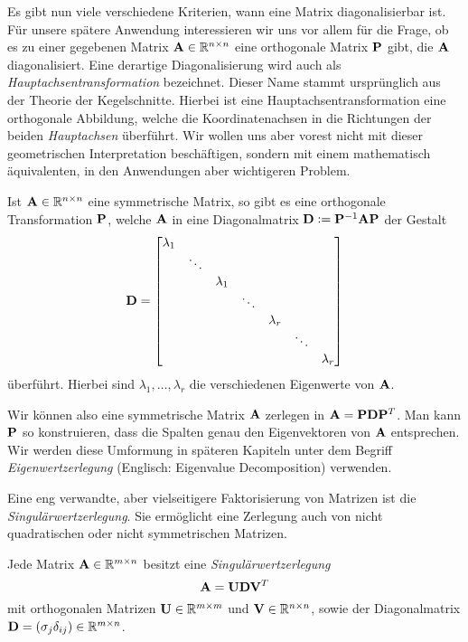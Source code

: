 Es gibt nun viele verschiedene Kriterien, wann eine Matrix diagonalisierbar ist. Für unsere spätere Anwendung interessieren wir uns vor allem für die Frage, ob es zu einer gegebenen Matrix $\mathbf{A} \in \mathbb{R}^{n \times n}$ eine orthogonale Matrix $\mathbf{P}$ gibt, die $\mathbf{A}$ diagonalisiert. Eine derartige Diagonalisierung wird auch als \textit{Hauptachsentransformation} bezeichnet. Dieser Name stammt ursprünglich aus der Theorie der Kegelschnitte. Hierbei ist eine Hauptachsentransformation eine orthogonale Abbildung, welche die Koordinatenachsen in die Richtungen der beiden \textit{Hauptachsen} überführt. Wir wollen uns aber vorest nicht mit dieser geometrischen Interpretation beschäftigen, sondern mit einem mathematisch äquivalenten, in den Anwendungen aber wichtigeren Problem.

\begin{thm}
Ist $\mathbf{A} \in \mathbb{R}^{n \times n}$ eine symmetrische Matrix, so gibt es eine orthogonale Transformation $\mathbf{P}$, welche $\mathbf{A}$ in eine Diagonalmatrix $\mathbf{D} \vcentcolon= \mathbf{P}^{-1}\mathbf{A}\mathbf{P}$ der Gestalt
$$\mathbf{D} = \begin{bmatrix}
    \lambda_{1} & & & & & & \\
    & \ddots & & & & & \\
    & & \lambda_1 & & & & \\
    & & & \ddots & & & \\
    & & & &\lambda_r & & \\
    & & & & & \ddots & \\
    & & & & & & \lambda_{r}
  \end{bmatrix}$$
überführt. Hierbei sind $\lambda_1, \ldots, \lambda_r$ die verschiedenen Eigenwerte von $\mathbf{A}$.
\end{thm}

Wir können also eine symmetrische Matrix $\mathbf{A}$ zerlegen in $\mathbf{A} = \mathbf{P} \mathbf{D} \mathbf{P}^T$. Man kann $\mathbf{P}$ so konstruieren, dass die Spalten genau den Eigenvektoren von $\mathbf{A}$ entsprechen. Wir werden diese Umformung in späteren Kapiteln unter dem Begriff \textit{Eigenwertzerlegung} (Englisch: Eigenvalue Decomposition) verwenden. 

Eine eng verwandte, aber vielseitigere Faktorisierung von Matrizen ist die \textit{Singulärwertzerlegung}. Sie ermöglicht eine Zerlegung auch von nicht quadratischen oder nicht symmetrischen Matrizen.

\begin{thm}
Jede Matrix $\mathbf{A} \in \mathbb{R}^{m \times n}$ besitzt eine \textit{Singulärwertzerlegung} 
$$\mathbf{A} = \mathbf{U}\mathbf{D}\mathbf{V}^{T}$$
mit orthogonalen Matrizen $\mathbf{U} \in \mathbb{R}^{m \times m}$ und $\mathbf{V} \in \mathbb{R}^{n \times n}$, sowie der Diagonalmatrix $\mathbf{D} = (\sigma_j\delta_{ij}) \in \mathbb{R}^{m \times n}$.
\end{thm}

